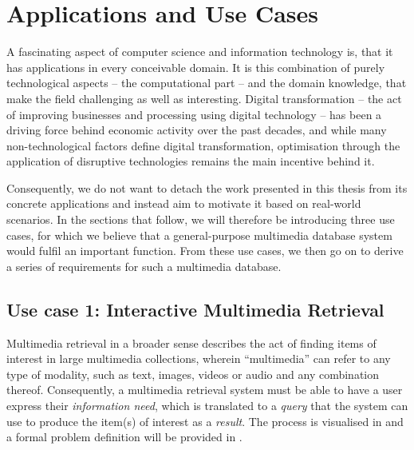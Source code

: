 \chapter{Applications and Use Cases}
\label{chapter:applications}

A fascinating aspect of computer science and information technology is, that it has applications in every conceivable domain. It is this combination of purely technological aspects -- the computational part -- and the domain knowledge, that make the field challenging as well as interesting. Digital transformation -- the act of improving businesses and processing using digital technology \cite{Vial:2019Understanding} -- has been a driving force behind economic activity over the past decades, and while many non-technological factors define digital transformation, optimisation through the application of disruptive technologies remains the main incentive behind it.

Consequently, we do not want to detach the work presented in this thesis from its concrete applications and instead aim to motivate it based on real-world scenarios. In the sections that follow, we will therefore be introducing three use cases, for which we believe that a general-purpose multimedia database system would fulfil an important function. From these use cases, we then go on to derive a series of requirements for such a multimedia database.

\section{Use case 1: Interactive Multimedia Retrieval}
\label{section:application_retrieval}

Multimedia retrieval in a broader sense describes the act of finding items of interest in large multimedia collections, wherein ``multimedia'' can refer to any type of modality, such as text, images, videos or audio and any combination thereof. Consequently, a multimedia retrieval system must be able to have a user express their \emph{information need}, which is translated to a \emph{query} that the system can use to produce the item(s) of interest as a \emph{result}. The process is visualised in  and a formal problem definition will be provided in .

